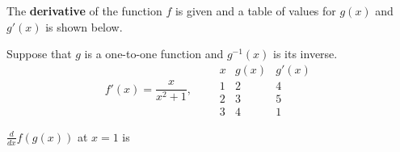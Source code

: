\documentclass{ximera}
\author{Gregory Hartman \and Matthew Carr}
\begin{document}
\begin{exercise}


The \textbf{derivative} of the function $f$ is given and a table of values for $g(x)$ and $g'(x)$ is shown below.

Suppose that $g$ is a one-to-one function and $g^{-1}(x)$ is its inverse.
\[
f'(x)=\frac{x}{x^2+1},
\qquad
\begin{array}{c|c|c}
x & g(x) & g'(x)\\ \hline
1 & 2 & 4\\ \hline
2 & 3 & 5\\ \hline
3 & 4 & 1
\end{array}
\]

$\frac{d}{dx}f(g(x))$ at $x=1$ is
\begin{prompt}
\begin{multipleChoice}
\end{multipleChoice}
\end{prompt}

\end{exercise}
\end{document}
